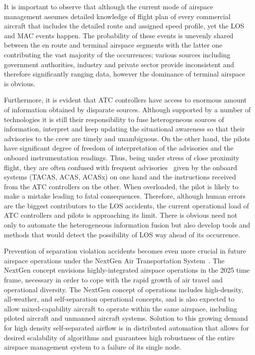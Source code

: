 \documentclass[letter,onecolumn,12pt]{aiaa-tc}
\newcommand{\1}{1_n}
\begin{document}
It is important to observe that although the current mode of airspace management assumes detailed knowledge of flight plan of every commercial aircraft that includes the detailed route and assigned speed profile, yet the LOS and MAC events happen. The probability of these events is unevenly shared between the en route and terminal airspace segments with the latter one contributing the vast majority of the occurrences; various sources including government authorities, industry and private sector provide inconsistent and therefore significantly ranging data, however the dominance of terminal airspace is obvious.

Furthermore, it is evident that ATC controllers have access to enormous amount of information obtained by disparate sources. Although supported by a number of technologies it is still their responsibility to fuse heterogeneous sources of information, interpret and keep updating the situational awareness so that their advisories to the crew are timely and unambiguous. On the other hand, the pilots have significant degree of freedom of interpretation of the advisories and the onboard instrumentation readings. Thus, being under stress of close proximity flight, they are often confused with frequent advisories~\cite{Kochenderfer_2012} given by the onboard systems (TACAS, ACAS, ACASx) on one hand and the instructions received from the ATC controllers on the other. When overloaded, the pilot is likely to make a mistake leading to fatal consequences. Therefore, although human errors are the biggest contributors to the LOS accidents, the current operational load of ATC controllers and pilots is approaching its limit. There is obvious need not only to automate the heterogeneous information fusion but also develop tools and methods that would detect the possibility of LOS way ahead of its occurrence. 


Prevention of separation violation accidents becomes even more crucial in future airspace operations under the NextGen Air Transportation  System~\cite{NextGen_ConOps}. The NextGen concept envisions highly-integrated airspace operations in the 2025 time frame, necessary in order to cope with the rapid growth of air travel and operational diversity. The NextGen concept of operations includes high-density, all-weather, and self-separation operational concepts, and is also expected to allow mixed-capability aircraft to operate within the same airspace, including piloted aircraft and unmanned aircraft systems. Solution to this growing demand for high density self-separated airflow is in distributed automation that allows for desired scalability of algorithms and guarantees high robustness of the entire airspace management system to a failure of its single node.
\end{document}
